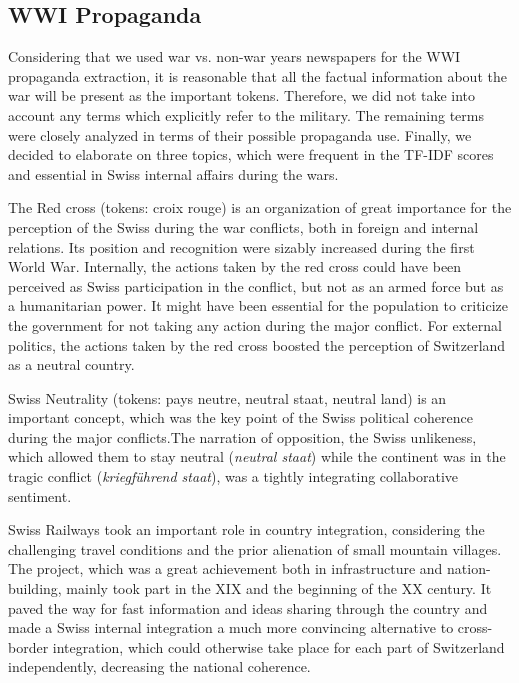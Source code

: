 \documentclass[11pt]{article}
\begin{document}
\subsection{WWI Propaganda}
Considering that we used war vs. non-war years newspapers for the WWI propaganda extraction, it is reasonable that all the factual information about the war will be present as the important tokens. Therefore, we did not take into account any terms which explicitly refer to the military. The remaining terms were closely analyzed in terms of their possible propaganda use. Finally, we decided to elaborate on three topics, which were frequent in the TF-IDF scores and essential in Swiss internal affairs during the wars. \par
The Red cross (tokens: croix rouge) is an organization of great importance for the perception of the Swiss during the war conflicts, both in foreign and internal relations. Its position and recognition were sizably increased during the first World War. Internally, the actions taken by the red cross could have been perceived as Swiss participation in the conflict, but not as an armed force but as a humanitarian power. It might have been essential for the population to criticize the government for not taking any action during the major conflict. For external politics, the actions taken by the red cross boosted the perception of Switzerland as a neutral country. \par

Swiss Neutrality (tokens: pays neutre, neutral staat, neutral land) is an important concept, which was the key point of the Swiss political coherence during the major conflicts.The narration of opposition, the Swiss unlikeness, which allowed them to stay neutral (\emph{neutral staat}) while the continent was in the tragic conflict (\emph{kriegführend staat}), was a tightly integrating collaborative sentiment. 

Swiss Railways took an important role in country integration, considering the challenging travel conditions and the prior alienation of small mountain villages. The project, which was a great achievement both in infrastructure and nation-building, mainly took part in the XIX and the beginning of the XX century. It paved the way for fast information and ideas sharing through the country and made a Swiss internal integration a much more convincing alternative to cross-border integration, which could otherwise take place for each part of Switzerland independently, decreasing the national coherence. \par
\end{document}
